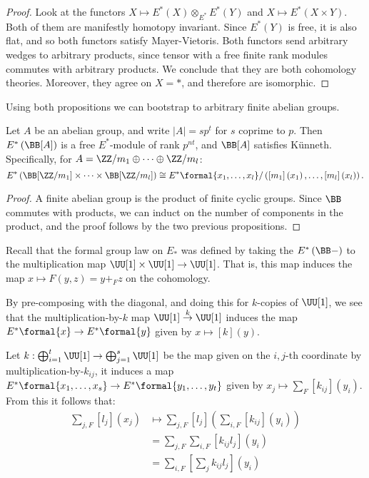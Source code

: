 \begin{proof}
	Look at the functors $X \mapsto E^*\left(X\right) \otimes_{E^*} E^*\left(Y\right)$ and $X \mapsto E^*\left(X \times Y\right)$.
	Both of them are manifestly homotopy invariant.
	Since $E^*\left(Y\right)$ is free, it is also flat, and so both functors satisfy Mayer-Vietoris.
	Both functors send arbitrary wedges to arbitrary products, since tensor with a free finite rank modules commutes with arbitrary products.
	We conclude that they are both cohomology theories.
	Moreover, they agree on $X = *$, and therefore are isomorphic.
\end{proof}

Using both propositions we can bootstrap to arbitrary finite abelian groups.

\begin{proposition}\label{E-B-abelian}
	Let $A$ be an abelian group, and write $\left|A\right| = sp^t$ for $s$ coprime to $p$.
	Then $E^*\left(\BB[A]\right)$ is a free $E^*$-module of rank $p^{nt}$, and $\BB[A]$ satisfies K\"unneth.
	Specifically, for $A = \ZZ/m_1 \oplus \cdots \oplus \ZZ/m_l$:
	$$
	E^*\left(\BB[\ZZ/m_1] \times \cdots \times \BB[\ZZ/m_l]\right)
	\cong E^*\formal{x_1, \dotsc, x_l}/\left(\left[m_1\right]\left(x_1\right), \dotsc, \left[m_l\right]\left(x_l\right)\right).
	$$
\end{proposition}

\begin{proof}
	A finite abelian group is the product of finite cyclic groups.
	Since $\BB$ commutes with products, we can induct on the number of components in the product, and the proof follows by the two previous propositions.
\end{proof}

Recall that the formal group law on $E_*$ was defined by taking the $E^*\left(\BB-\right)$ to the multiplication map $\UU[1] \times \UU[1] \to \UU[1]$.
That is, this map induces the map $x \mapsto F\left(y, z\right) = y +_F z$ on the cohomology.

By pre-composing with the diagonal, and doing this for $k$-copies of $\UU[1]$, we see that the multiplication-by-$k$ map $\UU[1] \overset{k}{\to} \UU[1]$ induces the map $E^*\formal{x} \to E^*\formal{y}$ given by $x \mapsto \left[k\right]\left(y\right)$.

Let $k: \bigoplus_{i=1}^t \UU[1] \to \bigoplus_{j=1}^s \UU[1]$ be the map given on the $i,j$-th coordinate by multiplication-by-$k_{ij}$, it induces a map
$E^*\formal{x_1, \dotsc, x_s} \to E^*\formal{y_1, \dotsc, y_t}$
given by $x_j \mapsto \sum_F\left[k_{ij}\right]\left(y_i\right)$.
From this it follows that:
\begin{align*}
	\sum_{j,F}\left[l_j\right]\left(x_j\right)
	&\mapsto \sum_{j,F}\left[l_j\right]\left(\sum_{i,F}\left[k_{ij}\right]\left(y_i\right)\right)\\
	&= \sum_{j,F}\sum_{i,F}\left[k_{ij} l_j\right]\left(y_i\right)\\
	&= \sum_{i,F}\left[\sum_j k_{ij} l_j\right]\left(y_i\right)
\end{align*}

